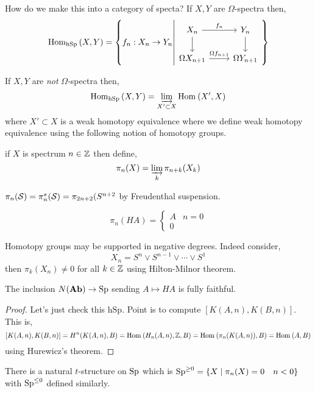 \documentclass[12pt]{article}
\begin{document}
How do we make this into a category of specta? If $X, Y$ are $\Omega$-spectra then,
\[ \Hom{\mathrm{hSp}}{X}{Y} = \left\{ f_n : X_n \to Y_n \middle| 
\begin{tikzcd}
X_n \arrow[r, "f_n"] \arrow[d] & Y_n \arrow[d]
\\
\Omega X_{n+1} \arrow[r, "\Omega f_{n+1}"] & \Omega Y_{n+1} 
\end{tikzcd} \right\} \]

If $X, Y$ are \textit{not} $\Omega$-spectra then,
\[ \Hom{\text{hSp}}{X}{Y} = \dlim_{X' \subset X} \Hom{}{X'}{X} \]
where $X' \subset X$ is a weak homotopy equivalence where we define weak homotopy equivalence using the following notion of homotopy groups.

\begin{defn}
if $X$ is spectrum $n \in \ZZ$ then define,
\[ \pi_n(X) = \dlim_k \pi_{n+k}(X_k) \]
\end{defn}

\begin{example}
$\pi_n(\S) = \pi_n^s(\S) = \pi_{2n + 2}(S^{n+2}$ by Freudenthal suspension.
\end{example}

\begin{example}
\[ \pi_n(HA) = 
\begin{cases}
A & n = 0
\\
0
\end{cases} \]
\end{example}

\begin{example}
Homotopy groups may be supported in negative degrees. Indeed consider,
\[ X_n = S^n \vee S^{n-1} \vee \cdots \vee S^1 \]
then $\pi_k(X_n) \neq 0$ for all $k \in \Z$ using Hilton-Milnor theorem. 
\end{example}

\begin{prop}
The inclusion $N(\Ab) \to \Sp$ sending $A \mapsto HA$ is fully faithful.
\end{prop}

\begin{proof}
Let's just check this $\mathrm{hSp}$. Point is to compute $[K(A, n), K(B, n)]$. This is,
\[ [K(A, n), K(B, n)] = H^n(K(A, n), B) = \Hom{}{H_n(A, n), \Z}{B} = \Hom{}{\pi_n(K(A, n))}{B} = \Hom{}{A}{B} \]
using Hurewicz's theorem. 
\end{proof}

\begin{defn}
There is a natural $t$-structure on $\Sp$ which is $\Sp^{\ge 0} = \{ X \mid \pi_n(X) = 0 \quad n < 0 \}$ with $\Sp^{\le 0}$ defined similarly. 
\end{defn}
\end{document}
